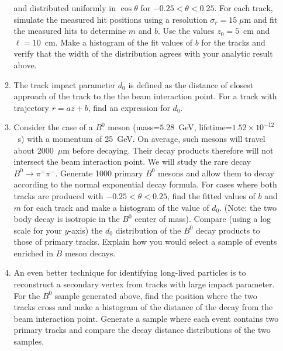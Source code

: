 \documentclass[12pt]{article}
\begin{document}
\begin{enumerate}
\begin{enumerate}
    and distributed uniformly in $\cos\theta$ for
    $-0.25 < \theta < 0.25$.  For each track, simulate the measured hit positions
    using a resolution $\sigma_r=15\;\mu$m and fit the measured
    hits to determine $m$ and $b$.  Use the values $z_0=5$~cm and $\ell=10$~cm.
    Make a histogram of the fit values of $b$ for the tracks and
    verify that the width of the distribution agrees with your analytic result above.
  \item The track impact parameter $d_0$ is defined as the distance of closest
    approach of the track to the the beam interaction point.  For
    a track with trajectory $r = az +b$, find an expression for $d_0$.
  \item Consider the case of a $B^0$ meson
    (mass=$5.28$~GeV, lifetime=$1.52\times 10^{-12}$~s) with a momentum of 25~GeV.
    On average, such mesons will travel about 2000~$\mu$m before decaying.  Their
    decay products therefore will not intersect the beam interaction point.
    We will study the rare decay $B^0\rightarrow \pi^+ \pi^-$.  Generate 1000
    primary $B^0$ mesons and allow them to decay according to the normal
    exponential decay formula. For cases
    where both tracks are produced with $-0.25 < \theta < 0.25$, find the
    fitted values of $b$ and $m$ for each track and make a histogram of
    the value of $d_0$. (Note: the
    two body decay is isotropic in the $B^0$ center of mass).
    Compare (using a log scale for your $y$-axis) the
    $d_0$ distribution of the $B^0$ decay products to those of primary tracks.
    Explain how you would select a sample of events enriched in $B$ meson decays.
  \item An even better technique for identifying long-lived particles is to
    reconstruct a secondary vertex from tracks with large impact parameter.
    For the $B^0$ sample generated above, find the position where the two
    tracks cross and make a histogram of the distance of the decay from the
    beam interaction point.
    Generate a sample where each event contains two primary tracks
    and compare the decay distance distributions of the two samples.
  \end{enumerate}
\end{enumerate}
\end{document}
